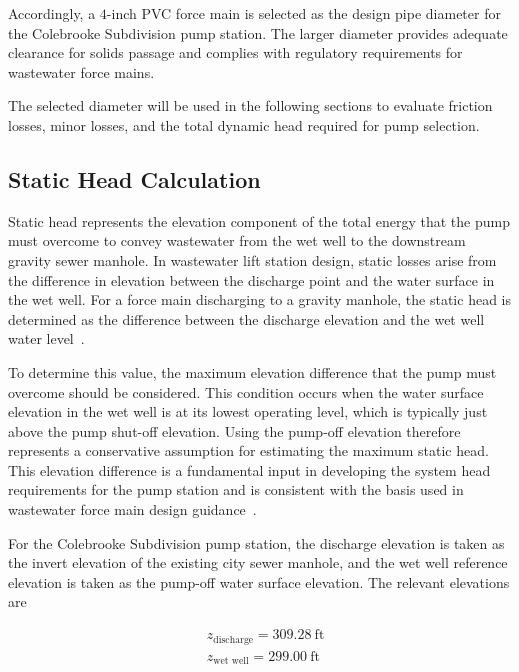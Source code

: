 Accordingly, a $4$-inch PVC force main is selected as the design pipe diameter for the Colebrooke Subdivision pump station. The larger diameter provides adequate clearance for solids passage and complies with regulatory requirements for wastewater force mains.

The selected diameter will be used in the following sections to evaluate friction losses, minor losses, and the total dynamic head required for pump selection.


\subsection{Static Head Calculation}

Static head represents the elevation component of the total energy that the pump must overcome to convey wastewater from the wet well to the downstream gravity sewer manhole. In wastewater lift station design, static losses arise from the difference in elevation between the discharge point and the water surface in the wet well. For a force main discharging to a gravity manhole, the static head is determined as the difference between the discharge elevation and the wet well water level~\cite{Jensen_PumpStationDesignGuidelines_2012}. 

To determine this value, the maximum elevation difference that the pump must overcome should be considered. This condition occurs when the water surface elevation in the wet well is at its lowest operating level, which is typically just above the pump shut-off elevation. Using the pump-off elevation therefore represents a conservative assumption for estimating the maximum static head. This elevation difference is a fundamental input in developing the system head requirements for the pump station and is consistent with the basis used in wastewater force main design guidance~\cite{MDEQ_DesignGuidance_2025}.

For the Colebrooke Subdivision pump station, the discharge elevation is taken as the invert elevation of the existing city sewer manhole, and the wet well reference elevation is taken as the pump-off water surface elevation. The relevant elevations are

\[
  \begin{aligned}
    & z_{\text{discharge}} = 309.28 \ \text{ft} \\
    & z_{\text{wet well}} = 299.00 \ \text{ft}
  \end{aligned}
\]


